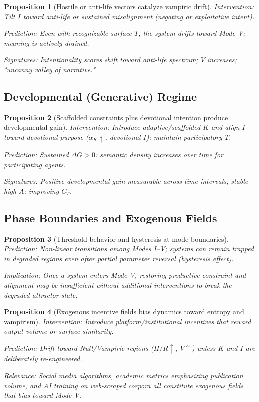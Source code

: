 \documentclass[12pt]{article}
\newtheorem{proposition}{Proposition}
\begin{document}
\begin{proposition}[Hostile or anti-life vectors catalyze vampiric drift]
\label{prop:p6}
Intervention: Tilt $I$ toward anti-life or sustained misalignment (negating or exploitative intent).

Prediction: Even with recognizable surface $T$, the system drifts toward Mode V; meaning is actively drained.

Signatures: Intentionality scores shift toward anti-life spectrum; $V$ increases; "uncanny valley of narrative."
\end{proposition}

\subsection{Developmental (Generative) Regime}

\begin{proposition}[Scaffolded constraints plus devotional intention produce developmental gain]
\label{prop:p7}
Intervention: Introduce adaptive/scaffolded $K$ and align $I$ toward devotional purpose ($\alpha_K \uparrow$, devotional $I$); maintain participatory $T$.

Prediction: Sustained $\Delta G > 0$: semantic density increases over time for participating agents.

Signatures: Positive developmental gain measurable across time intervals; stable high $A$; improving $C_T$.
\end{proposition}

\subsection{Phase Boundaries and Exogenous Fields}

\begin{proposition}[Threshold behavior and hysteresis at mode boundaries]
\label{prop:p8}
Prediction: Non-linear transitions among Modes I–V; systems can remain trapped in degraded regions even after partial parameter reversal (hysteresis effect).

Implication: Once a system enters Mode V, restoring productive constraint and alignment may be insufficient without additional interventions to break the degraded attractor state.
\end{proposition}

\begin{proposition}[Exogenous incentive fields bias dynamics toward entropy and vampirism]
\label{prop:p9}
Intervention: Introduce platform/institutional incentives that reward output volume or surface similarity.

Prediction: Drift toward Null/Vampiric regions ($H/R \uparrow$, $V \uparrow$) unless $K$ and $I$ are deliberately re-engineered.

Relevance: Social media algorithms, academic metrics emphasizing publication volume, and AI training on web-scraped corpora all constitute exogenous fields that bias toward Mode V.
\end{proposition}
\end{document}
